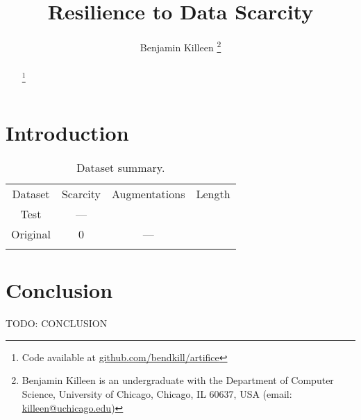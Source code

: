 \documentclass[10pt, journal]{IEEEtran}
\title{Resilience to Data Scarcity}
\author{Benjamin Killeen %
  \thanks{Benjamin Killeen is an undergraduate with the Department of Computer
    Science, University of Chicago, Chicago, IL 60637, USA (email:
    \href{mailto:killeen@uchicago.edu}{killeen@uchicago.edu})} %
}
\begin{document}
\maketitle

\begin{abstract}
  \footnote{Code available at \href{https://github.com/bendkill/artifice}
    {github.com/bendkill/artifice}}
\end{abstract}

\section{Introduction}
\label{sec:introduction}

\begin{table}
  \centering
  \begin{tabular}{|c|c|c|c|}
    Dataset & Scarcity & Augmentations & Length \\
    Test & --- \\
    Original & 0 & --- & \\
    & 
  \end{tabular}
  \caption{Dataset summary.}
  \label{tab:dataset-summary}
\end{table}

\section{Conclusion}
\label{sec:conclusion}

TODO: CONCLUSION



\end{document}
